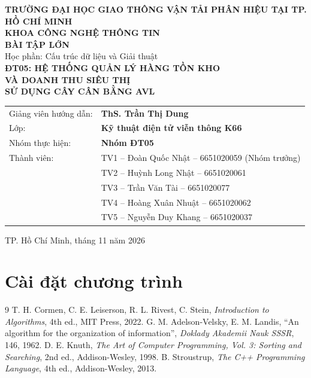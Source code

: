 \documentclass[11pt,a4paper]{extreport}
\begin{document}
\begin{titlepage}
\centering
{\large \textbf{TRƯỜNG ĐẠI HỌC GIAO THÔNG VẬN TẢI PHÂN HIỆU TẠI TP. HỒ CHÍ MINH}}\\[2pt]
{\large \textbf{KHOA CÔNG NGHỆ THÔNG TIN}}\\[2.5cm]
{\Large \textbf{BÀI TẬP LỚN}}\\[4pt]
{\large Học phần: Cấu trúc dữ liệu và Giải thuật}\\[1.5cm]
{\LARGE \textbf{ĐT05: HỆ THỐNG QUẢN LÝ HÀNG TỒN KHO\\ VÀ DOANH THU SIÊU THỊ\\ SỬ DỤNG CÂY CÂN BẰNG AVL}}\\[2cm]
\begin{flushleft}\hspace{3cm}
\begin{tabular}{@{}ll}
Giảng viên hướng dẫn: & \textbf{ThS. Trần Thị Dung}\\
Lớp: & \textbf{Kỹ thuật điện tử viễn thông K66}\\
Nhóm thực hiện: & \textbf{Nhóm ĐT05}\\
Thành viên: & TV1 -- Đoàn Quốc Nhật -- 6651020059 (Nhóm trưởng)\\
 & TV2 -- Huỳnh Long Nhật -- 6651020061\\
 & TV3 -- Trần Văn Tài -- 6651020077\\
 & TV4 -- Hoàng Xuân Nhuật -- 6651020062\\
 & TV5 -- Nguyễn Duy Khang -- 6651020037\\
\end{tabular}
\end{flushleft}
\vfill
{\large TP. Hồ Chí Minh, tháng 11 năm 2026}
\end{titlepage}


\tableofcontents
\clearpage
\listoffigures
\listoftables
\clearpage
{}





\chapter{Cài đặt chương trình}








\begin{thebibliography}{9}
 T. H. Cormen, C. E. Leiserson, R. L. Rivest, C. Stein, \textit{Introduction to Algorithms}, 4th ed., MIT Press, 2022.
 G. M. Adelson-Velsky, E. M. Landis, ``An algorithm for the organization of information'', \textit{Doklady Akademii Nauk SSSR}, 146, 1962.
 D. E. Knuth, \textit{The Art of Computer Programming, Vol. 3: Sorting and Searching}, 2nd ed., Addison-Wesley, 1998.
 B. Stroustrup, \textit{The C++ Programming Language}, 4th ed., Addison-Wesley, 2013.
\end{thebibliography}



\end{document}
